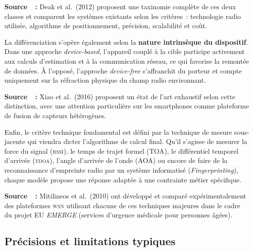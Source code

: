 \documentclass[12pt, a4paper]{article}
\newcommand{\TDOA}{\textsc{tdoa}}
\newcommand{\RSSI}{\textsc{rssi}}
\newcommand{\WSN}{\textsc{wsn}}
\begin{document}
\begin{citebox}
\textbf{Source~\cite{Deak2012}~:} Deak et al.\ (2012) proposent une taxinomie
complète de ces deux classes et comparent les systèmes existants selon les
critères~: technologie radio utilisée, algorithme de positionnement, précision,
scalabilité et coût.
\end{citebox}

La différenciation s'opère également selon la \textbf{nature intrinsèque du dispositif}. Dans une approche \textit{device-based}, l'appareil couplé à la cible participe activement aux calculs d'estimation et à la communication réseau, ce qui favorise la remontée de données. À l'opposé, l'approche \textit{device-free} s'affranchit du porteur et compte uniquement sur la réfraction physique du champ radio environnant.

\begin{citebox}
\textbf{Source~\cite{Xiao2016}~:} Xiao et al.\ (2016) proposent un état de l'art
exhaustif selon cette distinction, avec une attention particulière sur les
smartphones comme plateforme de fusion de capteurs hétérogènes.
\end{citebox}

Enfin, le critère technique fondamental est défini par la technique de mesure sous-jacente qui viendra dicter l'algorithme de calcul final. Qu'il s'agisse de mesurer la force du signal (\RSSI{}), le temps de trajet formel (TOA), le différentiel temporel d'arrivée (\TDOA{}), l'angle d'arrivée de l'onde (AOA) ou encore de faire de la reconnaissance d'empreinte radio par un système informatisé (\textit{Fingerprinting}), chaque modèle propose une réponse adaptée à une contrainte métier spécifique.

\begin{citebox}
\textbf{Source~\cite{Mitilineos2010}~:} Mitilineos et al.\ (2010) ont développé
et comparé expérimentalement des plateformes \WSN{} utilisant chacune de ces techniques majeures dans le cadre du projet EU \textit{EMERGE} (services d'urgence médicale pour personnes âgées).
\end{citebox}

\subsection{Précisions et limitations typiques}
\end{document}
